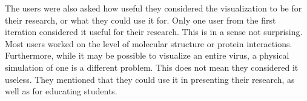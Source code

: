\documentclass[review,journal]{vgtc}         %
\begin{document}
The users were also asked how useful they considered the visualization to be for their research, or what they could use it for. Only one user from the first iteration considered it useful for their research. This is in a sense not surprising. Most users worked on the level of molecular structure or protein interactions. Furthermore, while it may be possible to visualize an entire virus, a physical simulation of one is a different problem. This does not mean they considered it useless. They mentioned that they could use it in presenting their research, as well as for educating students.









\end{document}
